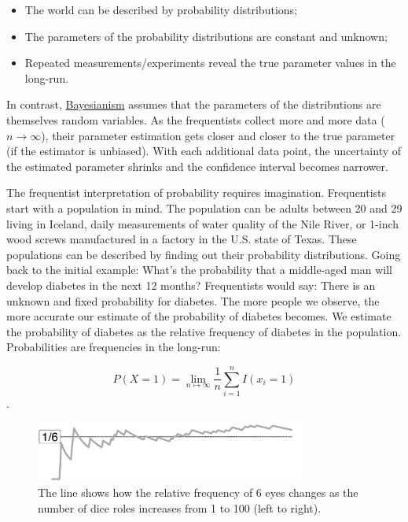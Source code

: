 \documentclass[
  10pt,
]{scrbook}
\providecommand{\tightlist}{%
  \setlength{\itemsep}{0pt}\setlength{\parskip}{0pt}}
\begin{document}
\begin{itemize}
\tightlist
\item
  The world can be described by probability distributions;
\item
  The parameters of the probability distributions are constant and unknown;
\item
  Repeated measurements/experiments reveal the true parameter values in the long-run.
\end{itemize}

In contrast, \protect\hyperlink{bayesian-inference}{Bayesianism} assumes that the parameters of the distributions are themselves random variables.
As the frequentists collect more and more data (\(n \to \infty\)), their parameter estimation gets closer and closer to the true parameter (if the estimator is unbiased).
With each additional data point, the uncertainty of the estimated parameter shrinks and the confidence interval becomes narrower.

The frequentist interpretation of probability requires imagination.
Frequentists start with a population in mind.
The population can be adults between 20 and 29 living in Iceland, daily measurements of water quality of the Nile River, or 1-inch wood screws manufactured in a factory in the U.S. state of Texas.
These populations can be described by finding out their probability distributions.
Going back to the initial example:
What's the probability that a middle-aged man will develop diabetes in the next 12 months?
Frequentists would say: There is an unknown and fixed probability for diabetes.
The more people we observe, the more accurate our estimate of the probability of diabetes becomes.
We estimate the probability of diabetes as the relative frequency of diabetes in the population.
Probabilities are frequencies in the long-run:

\[P(X=1) = \lim_{n \mapsto \infty} \frac{1}{n}\sum_{i=1}^{n} I(x_i = 1)\].

\begin{figure}

{\centering \includegraphics[width=0.8\textwidth]{figures/dice-1} 

}

\caption{The line shows how the relative frequency of 6 eyes changes as the number of dice roles increases from 1 to 100 (left to right).}\label{fig:dice}
\end{figure}
\end{document}
